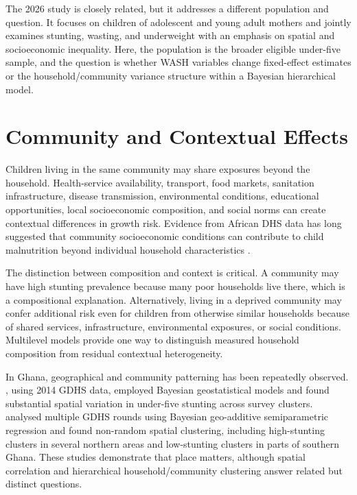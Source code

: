 The 2026 study is closely related, but it addresses a different population and question. It focuses on children of adolescent and young adult mothers and jointly examines stunting, wasting, and underweight with an emphasis on spatial and socioeconomic inequality. Here, the population is the broader eligible under-five sample, and the question is whether WASH variables change fixed-effect estimates or the household/community variance structure within a Bayesian hierarchical model.

\section{Community and Contextual Effects}

Children living in the same community may share exposures beyond the household. Health-service availability, transport, food markets, sanitation infrastructure, disease transmission, environmental conditions, educational opportunities, local socioeconomic composition, and social norms can create contextual differences in growth risk. Evidence from African DHS data has long suggested that community socioeconomic conditions can contribute to child malnutrition beyond individual household characteristics \cite{FotsoKuateDefo2006}.

The distinction between composition and context is critical. A community may have high stunting prevalence because many poor households live there, which is a compositional explanation. Alternatively, living in a deprived community may confer additional risk even for children from otherwise similar households because of shared services, infrastructure, environmental exposures, or social conditions. Multilevel models provide one way to distinguish measured household composition from residual contextual heterogeneity.

In Ghana, geographical and community patterning has been repeatedly observed. \citet{AhetoDagne2021}, using 2014 GDHS data, employed Bayesian geostatistical models and found substantial spatial variation in under-five stunting across survey clusters. \citet{AmoakoJohnson2022} analysed multiple GDHS rounds using Bayesian geo-additive semiparametric regression and found non-random spatial clustering, including high-stunting clusters in several northern areas and low-stunting clusters in parts of southern Ghana. These studies demonstrate that place matters, although spatial correlation and hierarchical household/community clustering answer related but distinct questions.

